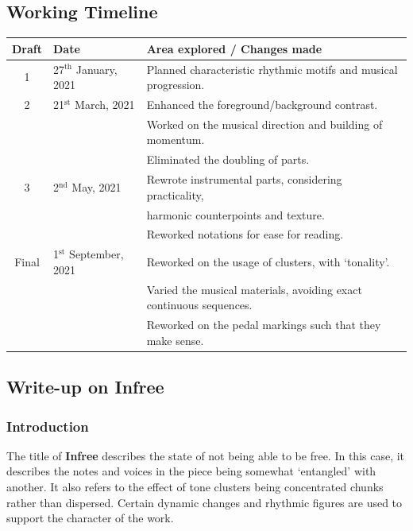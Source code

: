 \documentclass{article}
\begin{document}
\subsection{Working Timeline}
\begin{center}
	\def\arraystretch{1.5}
\begin{tabular}{|c|l|l|}
	\hline
	Draft&Date&Area explored / Changes made\\
	\hline
	1&27\(^{\text{th}}\) January, 2021
    &Planned characteristic rhythmic motifs and musical progression.\\
	\hline
	2&21\(^{\text{st}}\) March, 2021
    &Enhanced the foreground/background contrast.\\
    &&Worked on the musical direction and building of momentum.\\
    &&Eliminated the doubling of parts.\\
	\hline
	3&2\(^{\text{nd}}\) May, 2021
    &Rewrote instrumental parts, considering practicality,\\
    &&harmonic counterpoints and texture.\\
    &&Reworked notations for ease for reading.\\
	\hline
	Final&1\(^{\text{st}}\) September, 2021
    &Reworked on the usage of clusters, with `tonality'.\\
    &&Varied the musical materials, avoiding exact continuous sequences.\\
    &&Reworked on the pedal markings such that they make sense.\\
	\hline
\end{tabular}
\end{center}

\subsection{Write-up on {\bf Infree}}

\subsubsection{Introduction}

The title of \textbf{Infree} describes the state of not being able to be free.
In this case, it describes the notes and voices in the piece being somewhat
`entangled' with another. It also refers to the effect of tone clusters being
concentrated chunks rather than dispersed. Certain dynamic changes and rhythmic
figures are used to support the character of the work.\\
\end{document}
